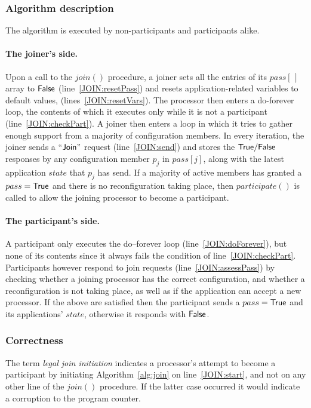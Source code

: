 \documentclass[11pt]{article}
\begin{document}
\subsubsection{Algorithm description}
The algorithm is executed by non-participants and participants alike.

\paragraph{The joiner's side.}
Upon a call to the $join()$ procedure, a joiner sets all the entries of its $pass[\,]$ array to $\sf False$ (line~\ref{JOIN:resetPass}) and resets application-related variables to default values, (lines~\ref{JOIN:resetVars}).
The processor then enters a do-forever loop, the contents of which it executes only while it is not a participant (line~\ref{JOIN:checkPart}).
A joiner then enters a loop in which it tries to gather enough support from a majority of configuration members.
In every iteration, the joiner sends a $\sf ``Join"$ request (line~\ref{JOIN:send}) and stores the $\sf True/False$ responses by any configuration member $p_j$ in $pass[j]$, along with the latest application $state$ that $p_j$ has send. 
If a majority of active members has granted a $pass = \sf True$ and there is no reconfiguration taking place, then $participate()$ is called to allow the joining processor to become a participant.


\paragraph{The participant's side.}
A participant only executes the do--forever loop (line~\ref{JOIN:doForever}), but none of its contents since it always fails the condition of line~\ref{JOIN:checkPart}. 
Participants however respond to join requests (line~\ref{JOIN:assessPass}) by checking whether a joining processor has the correct configuration, and whether a reconfiguration is not taking place, as well as if the application can accept a new processor.
If the above are satisfied then the participant sends a $pass = \sf True$ and its applications' $state$, otherwise it responds with $\sf False$. 



\subsubsection{Correctness}
\label{app:join}
The term \emph{legal join initiation} indicates a processor's attempt to become a participant by initiating Algorithm~\ref{alg:join} on line~\ref{JOIN:start}, and not on any other line of the $join()$ procedure. If the latter case occurred it would indicate a corruption to the program counter.
\end{document}
